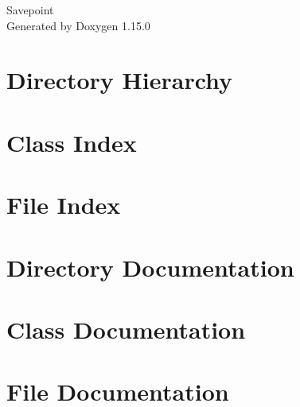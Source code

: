 \documentclass[twoside]{book}
\newcommand{\+}{\discretionary{\mbox{\scriptsize$\hookleftarrow$}}{}{}}
\newcommand{\clearemptydoublepage}{%
    \newpage{\pagestyle{empty}\cleardoublepage}%
  }
\begin{document}
  \raggedbottom
    \hypersetup{pageanchor=false,
                bookmarksnumbered=true,
                pdfencoding=unicode
               }
  \begin{titlepage}
  \vspace*{7cm}
  \begin{center}%
  {\Large Savepoint}\\
  \vspace*{1cm}
  {\large Generated by Doxygen 1.15.0}\\
  \end{center}
  \end{titlepage}
  \clearemptydoublepage
  \tableofcontents
  \clearemptydoublepage
  \hypersetup{pageanchor=true}
\chapter{Directory Hierarchy}

\chapter{Class Index}

\chapter{File Index}

\chapter{Directory Documentation}


\chapter{Class Documentation}






\chapter{File Documentation}




















  \backmatter
  \newpage
  \clearemptydoublepage
  \printindex
\end{document}
